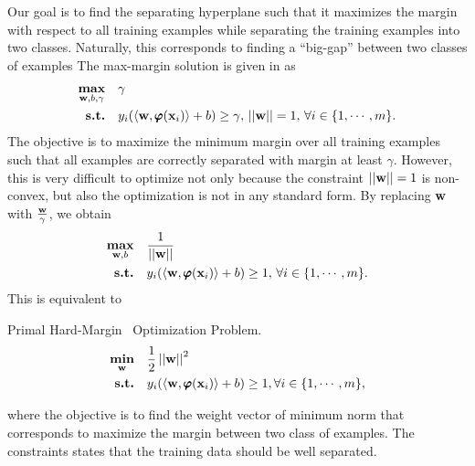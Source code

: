 {Our goal is to find the separating hyperplane such that it maximizes the margin with respect to all training examples while separating the training examples into two classes.
Naturally, this corresponds to finding a ``big-gap'' between two classes of examples
The max-margin solution is given in \citep{Bishop07} as
\begin{align*}
	\underset{\mathbf {w},b,\gamma}{\textbf{max}} &\quad \gamma\\
	\textbf{s.t.} &\quad y_i(\langle \mathbf {w}, \pmb \varphi(\mathbf {x}_i) \rangle+b) \ge \gamma, \, \left|\left| \mathbf {w} \right|\right|=1, \, \forall i\in\{1,\cdots,m\}.
\end{align*}
The objective is to maximize the minimum margin over all training examples such that all examples are correctly separated with margin at least $\gamma$.
However, this is very difficult to optimize not only because the constraint $\left|\left| \mathbf {w} \right|\right|=1$ is non-convex, but also the optimization is not in any standard form.
By replacing $\mathbf {w}$ with $\frac{\mathbf {w}}{\gamma}$, we obtain 
\begin{align*}
	\underset{\mathbf {w},b}{\textbf{max}} &\quad \frac{1}{\left|\left| \mathbf {w} \right|\right|}\\
	\textbf{s.t.} &\quad y_i(\langle \mathbf {w}, \pmb \varphi(\mathbf {x}_i) \rangle+b) \ge 1, \, \forall i\in\{1,\cdots,m\}.
\end{align*}
This is equivalent to
\begin{definition}{Primal Hard-Margin \svm\ Optimization Problem.}\label{hardsvmprimal}
	\begin{align*}
		\underset{\mathbf {w}}{\textbf{min}} & \quad\frac{1}{2}\left|\left| \mathbf {w} \right|\right|^2\\
		\textbf{s.t.} & \quad y_i(\langle \mathbf {w}, \pmb \varphi(\mathbf {x}_i) \rangle + b) \ge 1, \forall i\in\{1,\cdots,m\},
	\end{align*}
\end{definition}
where the objective is to find the weight vector of minimum norm that corresponds to maximize the margin between two class of examples.
The constraints states that the training data should be well separated.

}
